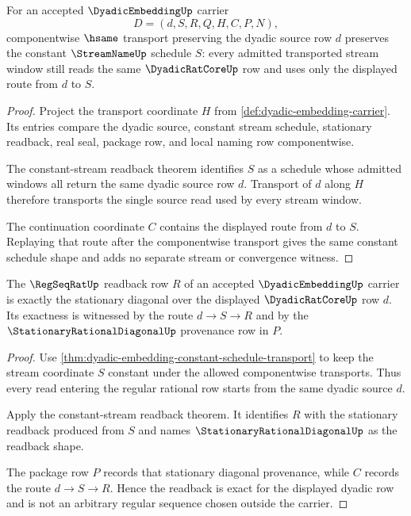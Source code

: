 \begin{theorem}
\label{thm:dyadic-embedding-constant-schedule-transport}
For an accepted $\DyadicEmbeddingUp$ carrier
$$
D=(d,S,R,Q,H,C,P,N),
$$
componentwise $\hsame$ transport preserving the dyadic source row $d$ preserves the constant $\StreamNameUp$ schedule $S$: every admitted transported stream window still reads the same $\DyadicRatCoreUp$ row and uses only the displayed route from $d$ to $S$.
\end{theorem}
\begin{proof}
Project the transport coordinate $H$ from \autoref{def:dyadic-embedding-carrier}. Its entries compare the dyadic source, constant stream schedule, stationary readback, real seal, package row, and local naming row componentwise.

The constant-stream readback theorem identifies $S$ as a schedule whose admitted windows all return the same dyadic source row $d$. Transport of $d$ along $H$ therefore transports the single source read used by every stream window.

The continuation coordinate $C$ contains the displayed route from $d$ to $S$. Replaying that route after the componentwise transport gives the same constant schedule shape and adds no separate stream or convergence witness.
\end{proof}

\begin{theorem}
\label{thm:dyadic-embedding-stationary-readback-exactness}
The $\RegSeqRatUp$ readback row $R$ of an accepted $\DyadicEmbeddingUp$ carrier is exactly the stationary diagonal over the displayed $\DyadicRatCoreUp$ row $d$. Its exactness is witnessed by the route $d \to S \to R$ and by the $\StationaryRationalDiagonalUp$ provenance row in $P$.
\end{theorem}
\begin{proof}
Use \autoref{thm:dyadic-embedding-constant-schedule-transport} to keep the stream coordinate $S$ constant under the allowed componentwise transports. Thus every read entering the regular rational row starts from the same dyadic source $d$.

Apply the constant-stream readback theorem. It identifies $R$ with the stationary readback produced from $S$ and names $\StationaryRationalDiagonalUp$ as the readback shape.

The package row $P$ records that stationary diagonal provenance, while $C$ records the route $d \to S \to R$. Hence the readback is exact for the displayed dyadic row and is not an arbitrary regular sequence chosen outside the carrier.
\end{proof}

